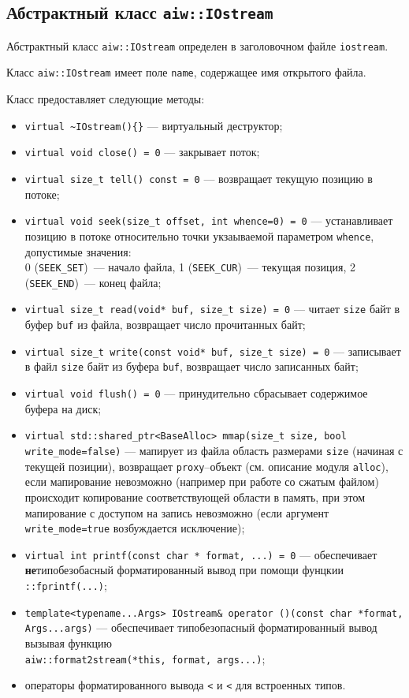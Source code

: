 \subsection{Абстрактный класс {\tt aiw::IOstream}}
Абстрактный класс \verb'aiw::IOstream' определен в заголовочном файле \verb'iostream'.

Класс \verb'aiw::IOstream' имеет поле \verb'name', содержащее имя открытого файла.

Класс предоставляет следующие методы:
\begin{itemize}
\item \verb'virtual ~IOstream(){}' --- виртуальный деструктор;
\item \verb'virtual void close() = 0' --- закрывает поток;
\item \verb'virtual size_t tell() const = 0' --- возвращает текущую позицию в потоке;
\item \verb'virtual void seek(size_t offset, int whence=0) = 0' --- устанавливает позицию в потоке относительно
  точки укзаываемой параметром \verb'whence', допустимые значения:\\
  0 (\verb'SEEK_SET')~--- начало файла, 1 (\verb'SEEK_CUR')~--- текущая позиция, 2 (\verb'SEEK_END')~--- конец файла;
\item \verb'virtual size_t read(void* buf, size_t size) = 0' --- читает \verb'size' байт в буфер \verb'buf' из файла,
  возвращает число прочитанных байт;
\item \verb'virtual size_t write(const void* buf, size_t size) = 0' --- записывает в файл \verb'size' байт из буфера \verb'buf',
  возвращает число записанных байт;
\item \verb'virtual void flush() = 0' --- принудительно сбрасывает содержимое буфера на диск;
\item \verb'virtual std::shared_ptr<BaseAlloc> mmap(size_t size, bool write_mode=false)' --- мапирует из файла область
  размерами \verb'size' (начиная с текущей позиции), возвращает \verb'proxy'--объект (см. описание модуля \verb'alloc'),
  если мапирование невозможно (например при работе со сжатым файлом) происходит копирование
  соответствующей области в память, при этом мапирование с доступом на запись невозможно
  (если аргумент \verb'write_mode=true' возбуждается исключение);
\item \verb'virtual int printf(const char * format, ...) = 0' --- обеспечивает
  {\bf не}типобезобасный форматированный вывод при помощи фунцкии \verb'::fprintf(...)';
\item \verb'template<typename...Args> IOstream& operator ()(const char *format, Args...args)' --- обеспечивает
  типобезопасный форматированный вывод вызывая функцию\\  \verb'aiw::format2stream(*this, format, args...)';
\item операторы форматированного вывода \verb'<' и \verb'<' для встроенных типов.
\end{itemize}



